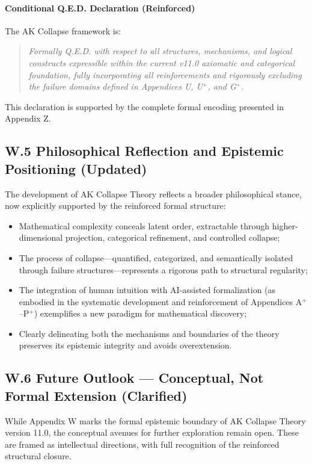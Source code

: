 \documentclass[11pt]{article}
\begin{document}
\paragraph{Conditional Q.E.D. Declaration (Reinforced)}  
The AK Collapse framework is:

\begin{quote}
\textit{Formally Q.E.D. with respect to all structures, mechanisms, and logical constructs expressible within the current v11.0 axiomatic and categorical foundation, fully incorporating all reinforcements and rigorously excluding the failure domains defined in Appendices U, U$^{+}$, and G$^{+}$.}
\end{quote}

This declaration is supported by the complete formal encoding presented in Appendix Z.

\subsection*{W.5 Philosophical Reflection and Epistemic Positioning (Updated)}

The development of AK Collapse Theory reflects a broader philosophical stance, now explicitly supported by the reinforced formal structure:

\begin{itemize}
    \item Mathematical complexity conceals latent order, extractable through higher-dimensional projection, categorical refinement, and controlled collapse;
    \item The process of collapse—quantified, categorized, and semantically isolated through failure structures—represents a rigorous path to structural regularity;
    \item The integration of human intuition with AI-assisted formalization (as embodied in the systematic development and reinforcement of Appendices A$^{+}$–P$^{+}$) exemplifies a new paradigm for mathematical discovery;
    \item Clearly delineating both the mechanisms and boundaries of the theory preserves its epistemic integrity and avoids overextension.
\end{itemize}

\subsection*{W.6 Future Outlook — Conceptual, Not Formal Extension (Clarified)}

While Appendix W marks the formal epistemic boundary of AK Collapse Theory version 11.0, the conceptual avenues for further exploration remain open. These are framed as intellectual directions, with full recognition of the reinforced structural closure.
\end{document}
